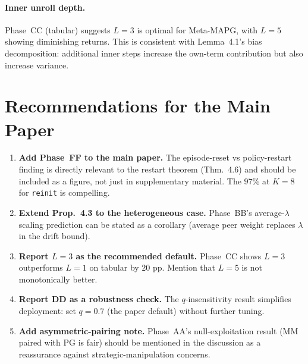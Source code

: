 \documentclass[11pt,a4paper]{article}
\begin{document}
\paragraph{Inner unroll depth.}
Phase~CC (tabular) suggests $L=3$ is optimal for Meta-MAPG, with $L=5$
showing diminishing returns. This is consistent with Lemma~4.1's bias
decomposition: additional inner steps increase the own-term contribution
but also increase variance.

\section{Recommendations for the Main Paper}
\label{sec:rec}

\begin{enumerate}
\item \textbf{Add Phase~FF to the main paper.} The episode-reset vs
  policy-restart finding is directly relevant to the restart theorem (Thm.~4.6)
  and should be included as a figure, not just in supplementary material.
  The $97\%$ at $K=8$ for \texttt{reinit} is compelling.

\item \textbf{Extend Prop.~4.3 to the heterogeneous case.} Phase~BB's
  average-$\lambda$ scaling prediction can be stated as a corollary
  (average peer weight replaces $\lambda$ in the drift bound).

\item \textbf{Report $L=3$ as the recommended default.} Phase~CC shows
  $L=3$ outperforms $L=1$ on tabular by $20$ pp. Mention that $L=5$ is
  not monotonically better.

\item \textbf{Report DD as a robustness check.} The $q$-insensitivity result
  simplifies deployment: set $q=0.7$ (the paper default) without further tuning.

\item \textbf{Add asymmetric-pairing note.} Phase~AA's null-exploitation result
  (MM paired with PG is fair) should be mentioned in the discussion as a
  reassurance against strategic-manipulation concerns.
\end{enumerate}
\end{document}
